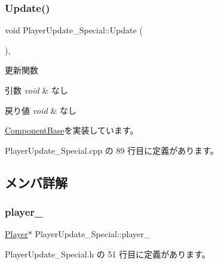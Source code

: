 \subsubsection{\texorpdfstring{Update()}{Update()}}
{\footnotesize\ttfamily void Player\+Update\+\_\+\+Special\+::\+Update (\begin{DoxyParamCaption}{ }\end{DoxyParamCaption})\hspace{0.3cm}{\ttfamily [override]}, {\ttfamily [virtual]}}



更新関数 


\begin{DoxyParams}{引数}
{\em void} & なし \\
\hline
\end{DoxyParams}

\begin{DoxyRetVals}{戻り値}
{\em void} & なし \\
\hline
\end{DoxyRetVals}


\mbox{\hyperlink{class_component_base_a58e66d65bc8f3cd5ab67b4b2deab4fc2}{Component\+Base}}を実装しています。



 Player\+Update\+\_\+\+Special.\+cpp の 89 行目に定義があります。



\subsection{メンバ詳解}
\mbox{\label{class_player_update___special_adbf3a64a60324cc274e2084bbeef04c9}} 
\subsubsection{\texorpdfstring{player\+\_\+}{player\_}}
{\footnotesize\ttfamily \mbox{\hyperlink{class_player}{Player}}$\ast$ Player\+Update\+\_\+\+Special\+::player\+\_\+\hspace{0.3cm}{\ttfamily [private]}}



 Player\+Update\+\_\+\+Special.\+h の 51 行目に定義があります。

\mbox{\label{class_player_update___special_a483e5e5a21d22c31c90194eb4e05e26f}} 
